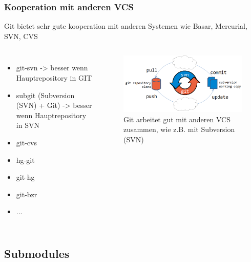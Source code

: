 \documentclass{beamer}
\begin{document}
\begin{frame}\frametitle{Kooperation mit anderen VCS}
Git bietet sehr gute kooperation mit anderen Systemen wie Basar, Mercurial, SVN, CVS

\begin{columns}
                \begin{itemize}                
					\item git-svn -> besser wenn Hauptrepository in GIT
					\item subgit (Subversion (SVN) + Git) -> besser wenn Hauptrepository in SVN
					\item git-cvs	
					\item hg-git
					\item git-hg
					\item git-bzr					
					\item ...
                \end{itemize}
\begin{figure}
\includegraphics[scale=0.4]{Bilder/subgit} 
{\footnotesize \caption{Git arbeitet gut mit anderen VCS zusammen, wie z.B. mit Subversion (SVN)}}
\end{figure}
\end{columns}
\end{frame}

\subsection{Submodules}
\end{document}
